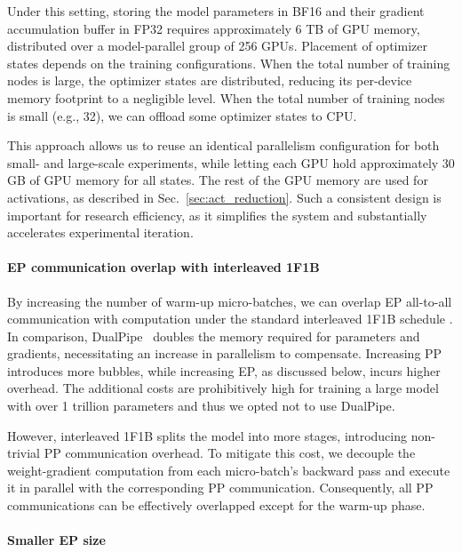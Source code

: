 Under this setting, storing the model parameters in BF16 and their gradient accumulation buffer in FP32 requires approximately 6 TB of GPU memory, distributed over a model-parallel group of 256 GPUs. 
Placement of optimizer states depends on the training configurations. When the total number of training nodes is large, the optimizer states are distributed, reducing its per-device memory footprint to a negligible level. When the total number of training nodes is small (e.g., 32), we can offload some optimizer states to CPU. 

This approach allows us to reuse an identical parallelism configuration for both small- and large-scale experiments, while letting each GPU hold approximately 30 GB of GPU memory for all states. The rest of the GPU memory are used for activations, as described in Sec.~\ref{sec:act_reduction}.
Such a consistent design is important for research efficiency, as it simplifies the system and substantially accelerates experimental iteration.

\paragraph{EP communication overlap with interleaved 1F1B}

By increasing the number of warm-up micro-batches, we can overlap EP all-to-all communication with computation under the standard interleaved 1F1B schedule \citep{harlap2018pipedream, narayanan2021efficient}. 
In comparison, DualPipe~\citep{deepseekai2024deepseekv3technicalreport} doubles the memory required for parameters and gradients, necessitating an increase in parallelism to compensate.
Increasing PP introduces more bubbles, while increasing EP, as discussed below, incurs higher overhead.
The additional costs are prohibitively high for training a large model with over 1 trillion parameters and thus we opted not to use DualPipe. 

However, interleaved 1F1B splits the model into more stages, introducing non-trivial PP communication overhead. To mitigate this cost, we decouple the weight-gradient computation from each micro-batch's backward pass and execute it in parallel with the corresponding PP communication.
Consequently, all PP communications can be effectively overlapped except for the warm-up phase.


\paragraph{Smaller EP size}

